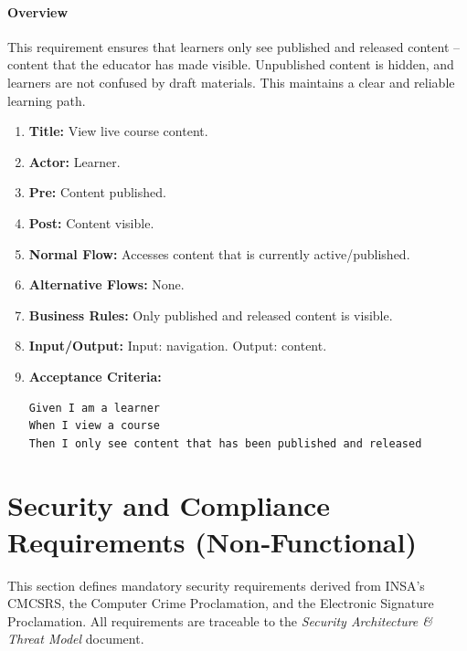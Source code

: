 \paragraph{Overview}
This requirement ensures that learners only see published and released content – content that the educator has made visible. Unpublished content is hidden, and learners are not confused by draft materials. This maintains a clear and reliable learning path.
\begin{enumerate}[label=\textbf{\arabic*.}]
\item \textbf{Title:} View live course content.
\item \textbf{Actor:} Learner.
\item \textbf{Pre:} Content published.
\item \textbf{Post:} Content visible.
\item \textbf{Normal Flow:} Accesses content that is currently active/published.
\item \textbf{Alternative Flows:} None.
\item \textbf{Business Rules:} Only published and released content is visible.
\item \textbf{Input/Output:} Input: navigation. Output: content.
\item \textbf{Acceptance Criteria:}
    \begin{verbatim}
Given I am a learner
When I view a course
Then I only see content that has been published and released
    \end{verbatim}
\end{enumerate}

\section{Security and Compliance Requirements (Non‑Functional)}
This section defines mandatory security requirements derived from INSA’s CMCSRS, the Computer Crime Proclamation, and the Electronic Signature Proclamation. All requirements are traceable to the \textit{Security Architecture \& Threat Model} document.

